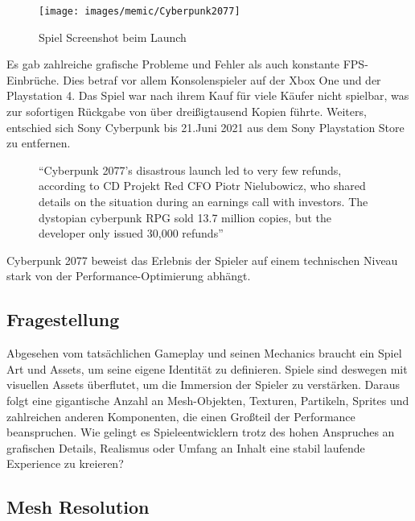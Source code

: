 \begin{figure}[H]
	\centering
	\texttt{[image: images/memic/Cyberpunk2077]}
	\caption{Spiel Screenshot beim Launch}
\end{figure}

Es gab zahlreiche grafische Probleme und Fehler als auch konstante FPS-Einbrüche. Dies betraf vor allem Konsolenspieler auf der Xbox One und der Playstation 4. Das Spiel war nach ihrem Kauf für viele Käufer nicht spielbar, was zur sofortigen Rückgabe von über dreißigtausend Kopien führte. Weiters, entschied sich Sony Cyberpunk bis 21.Juni 2021 aus dem Sony Playstation Store zu entfernen.
 
\begin{figure}[H]
		\centering
"`Cyberpunk 2077’s disastrous launch led to very few refunds, according to CD Projekt Red CFO Piotr Nielubowicz, who shared details on the situation during an earnings call with investors. The dystopian cyberpunk RPG sold 13.7 million copies, but the developer only issued 30,000 refunds"'
\end{figure}
\cite{_cyberpunk_article}

Cyberpunk 2077 beweist das Erlebnis der Spieler auf einem technischen Niveau stark von der Performance-Optimierung abhängt.

\subsection{Fragestellung}

Abgesehen vom tatsächlichen Gameplay und seinen Mechanics braucht ein Spiel Art und Assets, um seine eigene Identität zu definieren. Spiele sind deswegen mit visuellen Assets überflutet, um die Immersion der Spieler zu verstärken. Daraus folgt eine gigantische Anzahl an Mesh-Objekten, Texturen, Partikeln, Sprites und zahlreichen anderen Komponenten, die einen Großteil der Performance beanspruchen. Wie gelingt es Spieleentwicklern trotz des hohen Anspruches an grafischen Details, Realismus oder Umfang an Inhalt eine stabil laufende Experience zu kreieren?

\subsection{Mesh Resolution}

